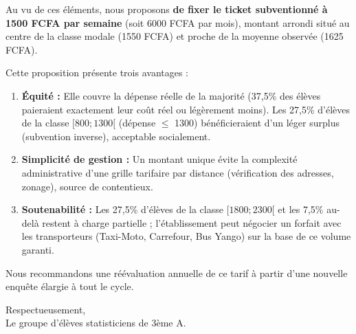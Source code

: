 \documentclass[11pt]{article}
\begin{document}
\begin{exoresolu}
Au vu de ces éléments, nous proposons \textbf{de fixer le ticket subventionné à 1500 FCFA par semaine} (soit 6000 FCFA par mois), montant arrondi situé au centre de la classe modale (1550 FCFA) et proche de la moyenne observée (1625 FCFA).

Cette proposition présente trois avantages :
\begin{enumerate}
    \item \textbf{Équité :} Elle couvre la dépense réelle de la majorité (37,5\% des élèves paieraient exactement leur coût réel ou légèrement moins). Les 27,5\% d'élèves de la classe $[800;1300[$ (dépense $\le$ 1300) bénéficieraient d'un léger surplus (subvention inverse), acceptable socialement.
    \item \textbf{Simplicité de gestion :} Un montant unique évite la complexité administrative d'une grille tarifaire par distance (vérification des adresses, zonage), source de contentieux.
    \item \textbf{Soutenabilité :} Les 27,5\% d'élèves de la classe $[1800;2300[$ et les 7,5\% au-delà restent à charge partielle ; l'établissement peut négocier un forfait avec les transporteurs (Taxi-Moto, Carrefour, Bus Yango) sur la base de ce volume garanti.
\end{enumerate}

Nous recommandons une réévaluation annuelle de ce tarif à partir d'une nouvelle enquête élargie à tout le cycle.

Respectueusement, \\
Le groupe d'élèves statisticiens de 3ème A.
\end{exoresolu}
\end{document}
